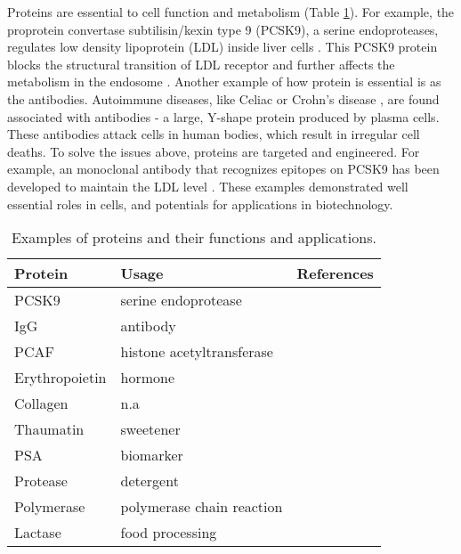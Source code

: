 \begin{refsection}
Proteins are essential to cell function and metabolism
\cite{Lambert2012,Horton2007,Dessein2008} (Table \ref{tab:protein-app}). For
example, the proprotein convertase subtilisin/kexin type 9 (PCSK9), a serine
endoproteases, regulates low density lipoprotein (LDL) inside liver
cells \cite{Lambert2012,Horton2007}. This PCSK9 protein blocks the structural
transition of LDL receptor and further affects the metabolism in the endosome
\cite{Lambert2012}. Another example of how protein is essential is as the
antibodies. Autoimmune diseases, like Celiac \cite{Dessein2008} or Crohn's
disease \cite{Sollid2005, Meize-Grochowski}, are found associated with
antibodies - a large, Y-shape protein produced by plasma cells. These
antibodies attack cells in human bodies, which result in irregular cell deaths.
To solve the issues above, proteins are targeted and engineered. For example,
an monoclonal antibody that recognizes epitopes on PCSK9 has been developed to
maintain the LDL level \cite{Lambert2012}. These examples demonstrated well
essential roles in cells, and potentials for applications in biotechnology.   
\begin{table}[htbp]
    \centering
    \begin{tabular}{ lll }
        \hline
        Protein & Usage & References \\
        \hline
        
        PCSK9 & serine endoprotease & \cite{Lambert2012,Horton2007} \\
        IgG & antibody & \cite{Sollid2005, Meize-Grochowski} \\
        PCAF & histone acetyltransferase & \cite{Mehta2011a} \\
        Erythropoietin & hormone & \cite{Haroon2003,Siren2001} \\
        Collagen & n.a & \cite{Bella1995} \\
        Thaumatin & sweetener & \cite{Green1999} \\
        PSA & biomarker & \cite{Crawford2014} \\
        Protease & detergent & \cite{Kirk2002} \\
        Polymerase & polymerase chain reaction & \cite{Berg2002} \\
        Lactase & food processing & \cite{Wiseman1993} \\

        \hline
    \end{tabular}
    \caption[Examples of proteins and their funtions and
    applications.]{Examples of proteins and their functions and applications.}
    \label{tab:protein-app}
\end{table}
 

\end{refsection}
